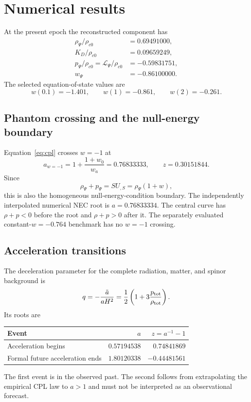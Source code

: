 \documentclass[11pt]{article}
\begin{document}
\section{Numerical results}

At the present epoch the reconstructed component has
\begin{align}
  \rho_\Psi/\rho_{c0}&=0.69491000,\\
  K_D/\rho_{c0}&=0.09659249,\\
  p_\Psi/\rho_{c0}=\mathcal L_\Psi/\rho_{c0}&=-0.59831751,\\
  w_\Psi&=-0.86100000.
\end{align}
The selected equation-of-state values are
\begin{equation}
  w(0.1)=-1.401,
  \qquad w(1)=-0.861,
  \qquad w(2)=-0.261.
\end{equation}

\subsection{Phantom crossing and the null-energy boundary}

Equation~\eqref{eq:cpl} crosses $w=-1$ at
\begin{equation}
  a_{w=-1}=1+\frac{1+w_0}{w_a}=0.76833333,
  \qquad z=0.30151844.
  \label{eq:crossing}
\end{equation}
Since
\begin{equation}
  \rho_\Psi+p_\Psi=SU_{,S}=\rho_\Psi(1+w),
\end{equation}
this is also the homogeneous null-energy-condition boundary.  The independently
interpolated numerical NEC root is $a=0.76833334$.  The central curve has
$\rho+p<0$ before the root and $\rho+p>0$ after it.  The separately evaluated
constant-$w=-0.764$ benchmark has no $w=-1$ crossing.

\subsection{Acceleration transitions}

The deceleration parameter for the complete radiation, matter, and spinor
background is
\begin{equation}
  q=-\frac{\ddot a}{aH^2}
  =\frac12\left(1+3\frac{p_{\rm tot}}{\rho_{\rm tot}}\right).
\end{equation}
Its roots are
\begin{center}
\begin{tabular}{@{}lrr@{}}
\toprule
Event & $a$ & $z=a^{-1}-1$ \\
\midrule
Acceleration begins & $0.57194538$ & $0.74841869$ \\
Formal future acceleration ends & $1.80120338$ & $-0.44481561$ \\
\bottomrule
\end{tabular}
\end{center}
The first event is in the observed past.  The second follows from extrapolating
the empirical CPL law to $a>1$ and must not be interpreted as an observational
forecast.
\end{document}
